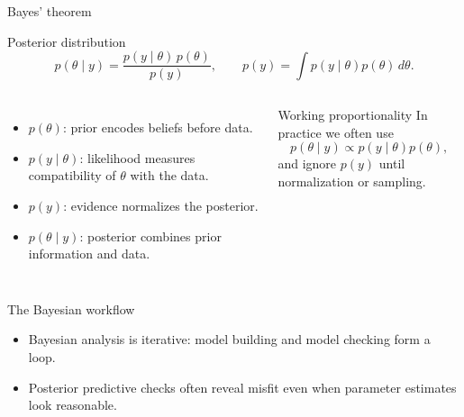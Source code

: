 \documentclass[aspectratio=169]{beamer}
\begin{document}
\begin{frame}{Bayes' theorem}
\begin{block}{Posterior distribution}
\[
  p(\theta\mid y)=\frac{p(y\mid\theta)\,p(\theta)}{p(y)},
  \qquad
  p(y)=\int p(y\mid\theta)p(\theta)\,d\theta.
\]
\end{block}

\begin{columns}[T,onlytextwidth]
\begin{itemize}
  \item $p(\theta)$: \alert{prior} encodes beliefs before data.
  \item $p(y\mid\theta)$: \alert{likelihood} measures compatibility of $\theta$ with the data.
  \item $p(y)$: \alert{evidence} normalizes the posterior.
  \item $p(\theta\mid y)$: \alert{posterior} combines prior information and data.
\end{itemize}

\begin{block}{Working proportionality}
In practice we often use
\[
  p(\theta\mid y)\propto p(y\mid\theta)p(\theta),
\]
and ignore $p(y)$ until normalization or sampling.
\end{block}
\end{columns}
\end{frame}

\begin{frame}{The Bayesian workflow}
\centering
{}

\vspace{0.8em}
\begin{itemize}
  \item Bayesian analysis is iterative: model building and model checking form a loop.
  \item Posterior predictive checks often reveal misfit even when parameter estimates look reasonable.
\end{itemize}
\end{frame}
\end{document}
